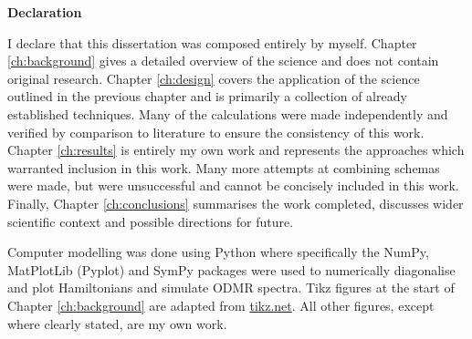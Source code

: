 \begin{center}
\textrm{\bfseries\Huge Declaration}%
\end{center}%
\vspace{1em}

I declare that this dissertation was composed entirely by myself. Chapter \ref{ch:background} gives a detailed overview of the science and does not contain original research. Chapter \ref{ch:design} covers the application of the science outlined in the previous chapter and is primarily a collection of already established techniques. Many of the calculations were made independently and verified by comparison to literature to ensure the consistency of this work. Chapter \ref{ch:results} is entirely my own work and represents the approaches which warranted inclusion in this work. Many more attempts at combining schemas were made, but were unsuccessful and cannot be concisely included in this work. 
Finally, Chapter \ref{ch:conclusions} summarises the work completed, discusses wider scientific context and possible directions for  
future. 

Computer modelling was done using Python where specifically the NumPy, MatPlotLib (Pyplot) and SymPy packages were used to numerically diagonalise and plot Hamiltonians and simulate ODMR spectra. Tikz figures at the start of Chapter \ref{ch:background} are adapted from \url{tikz.net}. All other figures, except where clearly stated, are my own work.  

%
%
%
%
%
%
\vspace*{\fill}
\newpage
%
%
